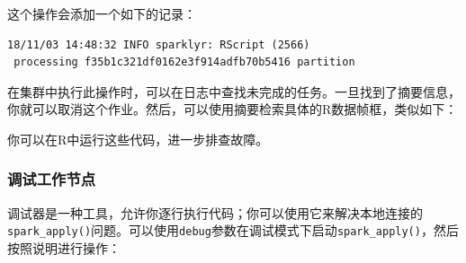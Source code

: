 \documentclass[
]{article}
\newenvironment{Shaded}{\begin{snugshade}}{\end{snugshade}}
\newcommand{\CommentTok}[1]{\textcolor[rgb]{0.56,0.35,0.01}{\textit{#1}}}
\newcommand{\ControlFlowTok}[1]{\textcolor[rgb]{0.13,0.29,0.53}{\textbf{#1}}}
\newcommand{\DecValTok}[1]{\textcolor[rgb]{0.00,0.00,0.81}{#1}}
\newcommand{\KeywordTok}[1]{\textcolor[rgb]{0.13,0.29,0.53}{\textbf{#1}}}
\newcommand{\NormalTok}[1]{#1}
\newcommand{\OperatorTok}[1]{\textcolor[rgb]{0.81,0.36,0.00}{\textbf{#1}}}
\newcommand{\StringTok}[1]{\textcolor[rgb]{0.31,0.60,0.02}{#1}}
\begin{document}
这个操作会添加一个如下的记录：

\begin{verbatim}
18/11/03 14:48:32 INFO sparklyr: RScript (2566)
 processing f35b1c321df0162e3f914adfb70b5416 partition
\end{verbatim}

在集群中执行此操作时，可以在日志中查找未完成的任务。一旦找到了摘要信息，你就可以取消这个作业。然后，可以使用摘要检索具体的R数据帧框，类似如下：

\begin{Shaded}
\end{Shaded}

你可以在R中运行这些代码，进一步排查故障。

\hypertarget{ux8c03ux8bd5ux5de5ux4f5cux8282ux70b9}{%
\subsubsection{调试工作节点}\label{ux8c03ux8bd5ux5de5ux4f5cux8282ux70b9}}

调试器是一种工具，允许你逐行执行代码；你可以使用它来解决本地连接的\texttt{spark\_apply()}问题。可以使用\texttt{debug}参数在调试模式下启动\texttt{spark\_apply()}，然后按照说明进行操作：
\end{document}
